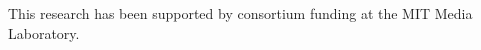 

\begin{acks}

This research has been supported by consortium funding at the MIT Media Laboratory. 

\end{acks}



